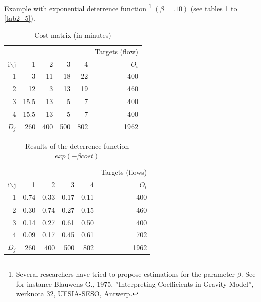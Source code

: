 Example with exponential deterrence function
\footnote{Several researchers have tried to propose estimations for the parameter
 $\beta$. See for instance Blauwens G., 1975, ''Interpreting
Coefficients in Gravity Model'', werknota 32, UFSIA-SESO, Antwerp.}
$(\beta=.10)$ (see tables \ref{tab2_3} to \ref{tab2_5}).

\begin{table}[htbp]
\begin{center}
\begin{tabular}{rrrrrr}
\hline
 & & & & & Targets (flow)\\
i$\backslash$j & 1 & 2 & 3 & 4 & $O_i$\\
\hline
1 & 3 & 11 & 18 & 22 & 400\\

2 & 12 & 3 & 13 & 19 & 460\\

3 & 15.5 & 13 & 5 & 7 & 400\\

4 & 15.5 & 13 & 5 & 7 & 400\\

$D_j$ & 260 & 400 & 500 & 802 & 1962\\
\hline
\end{tabular}
\caption{\label{tab2_3} Cost matrix (in minutes)}
\end{center}
\end{table}



\begin{table}[htbp]
\begin{center}
\begin{tabular}{rrrrrr}
\hline
& & & & & Targets (flows)\\ i$\backslash$j & 1 & 2 & 3 & 4 & $O_i$\\
\hline
1 & 0.74 & 0.33 & 0.17 & 0.11 & 400\\

2 & 0.30 & 0.74 & 0.27 & 0.15& 460\\

3 & 0.14 & 0.27 & 0.61 & 0.50 & 400\\

4 & 0.09 & 0.17 & 0.45 & 0.61 & 702\\

$D_j$ & 260 & 400 & 500 & 802 & 1962\\
\hline
\end{tabular}
\caption{\label{tab2_4} Results of the deterrence function $exp(-\beta cost)$}
\end{center}
\end{table}


